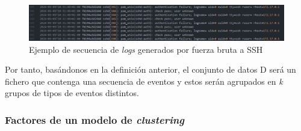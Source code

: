 \begin{figure}[H]
    \centering
    \includegraphics[width=1\linewidth]{imagenes/ssh-bruteforce-example.png}
    \caption{Ejemplo de secuencia de \textit{logs} generados por fuerza bruta a \gls{SSH}}
    \label{fig:SSH-bruteforce-example}
\end{figure}

Por tanto, basándonos en la definición anterior, el conjunto de datos D será un fichero que contenga una secuencia de eventos y estos serán agrupados en \textit{k} grupos de tipos de eventos distintos.

\newpage

\subsubsection*{Factores de un modelo de \textit{clustering}}


